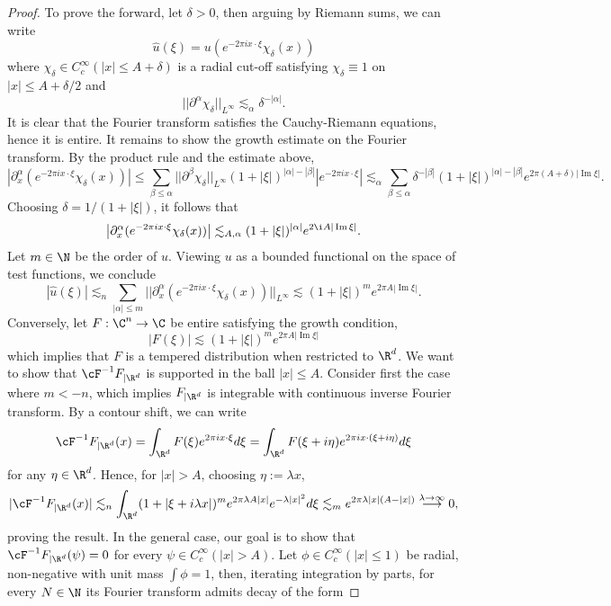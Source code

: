 \documentclass[reqno]{amsart}
\theoremstyle{definition}
\theoremstyle{remark}
\renewcommand{\Im}{\operatorname{Im}}
\begin{document}
\begin{proof}
	To prove the forward, let $\delta > 0$, then arguing by Riemann sums, we can write
		\[ \widehat u (\xi) = u (e^{-2\pi i x \cdot \xi} \chi_\delta (x) ) \]
	where $\chi_\delta \in C^\infty_c (|x| \leq A + \delta)$ is a radial cut-off satisfying $\chi_\delta \equiv 1$ on $|x| \leq A + \delta/2$ and 
		\[ ||\partial^\alpha \chi_\delta||_{L^\infty} \lesssim_\alpha \delta^{-|\alpha|}. \]
	It is clear that the Fourier transform satisfies the Cauchy-Riemann equations, hence it is entire. It remains to show the growth estimate on the Fourier transform. By the product rule and the estimate above, 
		\[ \left| \partial_x^\alpha (e^{-2\pi i x \cdot \xi} \chi_\delta (x)) \right| \leq \sum_{\beta \leq \alpha} ||\partial^\beta \chi_\delta||_{L^\infty} (1 + |\xi|)^{|\alpha| - |\beta|} \left|e^{- 2\pi i x \cdot \xi}\right| \lesssim_\alpha \sum_{\beta \leq \alpha} \delta^{-|\beta|} (1 + |\xi|)^{|\alpha| - |\beta|} e^{2\pi (A + \delta) |\Im \xi|}. \]
	Choosing $\delta = 1/(1 + |\xi|)$, it follows that 
		\[\left| \partial_x^\alpha (e^{-2\pi i x \cdot \xi} \chi_\delta (x)) \right| \lesssim_{A,\alpha} (1 + |\xi|)^{|\alpha|} e^{2\i A |\Im \xi|}. \]
	Let $m \in \N$ be the order of $u$. Viewing $u$ as a bounded functional on the space of test functions, we conclude
		\[ |\widehat u (\xi)| \lesssim_{n} \sum_{|\alpha| \leq m} || \partial_x^\alpha (e^{-2\pi i x \cdot \xi} \chi_\delta (x))  ||_{L^\infty} \lesssim (1 + |\xi|)^m e^{2\pi A |\Im \xi|}. \]		
	Conversely, let $F : \C^n \to \C$ be entire satisfying the growth condition,
		\[ |F (\xi)| \lesssim (1 + |\xi|)^m e^{2\pi A |\Im \xi|} \]
	which implies that $F$ is a tempered distribution when restricted to $\R^d$. We want to show that $\cF^{-1} F_{|\R^d}$ is supported in the ball $|x| \leq A$. Consider first the case where $m < -n$, which implies $F_{|\R^d}$ is integrable with continuous inverse Fourier transform. By a contour shift, we can write
		\[ \cF^{-1} F_{|\R^d} (x) =  \int_{\R^d} F(\xi) e^{2\pi i x \cdot \xi} d \xi =  \int_{\R^d} F(\xi + i \eta) e^{2\pi i x \cdot (\xi + i \eta)} d \xi \]
	for any $\eta \in \R^d$. Hence, for $|x| > A$, choosing $\eta := \lambda x$, 
		\[ |\cF^{-1} F_{|\R^d} (x)| \lesssim_n \int_{\R^d} (1 + |\xi + i \lambda x|)^m e^{2\pi  \lambda A|x| }e^{- \lambda |x|^2} d \xi \lesssim_m e^{2\pi \lambda |x| (A  - |x|)} \overset{\lambda \to \infty}{\longrightarrow} 0 , \]
	proving the result. In the general case, our goal is to show that $\cF^{-1} F_{|\R^d} (\psi) = 0$ for every $\psi \in C^\infty_c (|x| > A)$. Let $\phi \in C^\infty_c (|x| \leq 1)$ be radial, non-negative with unit mass $\int \phi = 1$, then, iterating integration by parts, for every $N \in \N$ its Fourier transform admits decay of the form

\end{proof}
\end{document}
